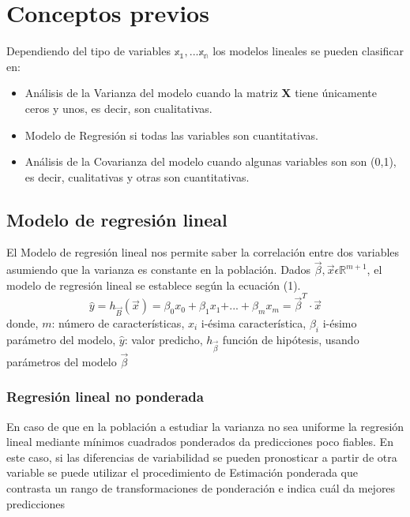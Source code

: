 \documentclass[sigconf]{acmart}
\begin{document}
	
	\section{Conceptos previos}
	
	Dependiendo del tipo de variables $\mathbb{x_{1},...x_{n}}$ los modelos lineales se pueden clasificar en: 
	\begin{itemize}
		\item{Análisis de la Varianza del modelo} cuando la matriz \textbf{X} tiene únicamente ceros y unos, es decir, son cualitativas.
		\item{Modelo de Regresión} si todas las variables son cuantitativas.
		\item{Análisis de la Covarianza del modelo} cuando algunas variables son son (0,1), es decir, cualitativas y otras son cuantitativas.
	\end{itemize}
	\subsection{Modelo de regresión lineal}
	El Modelo de regresión lineal nos permite saber la correlación entre dos variables asumiendo que la varianza es constante en la población. Dados $\overrightarrow{\beta}, \overrightarrow{x} \epsilon$$\mathbb{R}^{m+1}$, el modelo de regresión lineal se establece según la ecuación (1).
	\begin{equation}
		\hat{y}=h_{\overrightarrow{B}}(\overrightarrow{x})=\beta_{0}x_{0}+\beta_{1}x_{1}\mathrm{+...+}\beta_{m} x_{m}=\overrightarrow{\beta}^T \cdot \overrightarrow{x}  
	\end{equation}
	donde, $m$: número de características, $x_{i}$ i-ésima característica, $\beta_{i}$ i-ésimo parámetro del modelo, $\hat{y}$: valor predicho, $h_{\overrightarrow{\beta}}$ función de hipótesis, usando parámetros del modelo $\overrightarrow{\beta}$
	\subsubsection{Regresión lineal no ponderada
	}
	En caso de que en la población a estudiar la varianza no sea uniforme la regresión lineal mediante mínimos cuadrados ponderados da predicciones poco fiables. En este caso, si las diferencias de variabilidad se pueden pronosticar a partir de otra variable se puede utilizar el procedimiento de Estimación ponderada que contrasta un rango de transformaciones de ponderación e indica cuál da mejores predicciones
\end{document}
